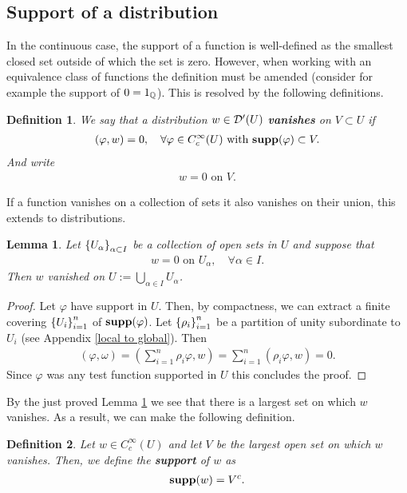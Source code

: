 \documentclass[12pt]{article}
\newtheorem{lemma}{Lemma}
\newtheorem{definition}{Definition}
\theoremstyle{remark}
\newcommand{\qt}[1]{\left(#1\right)}
\begin{document}
\subsection{Support of a distribution}
In the continuous case, the support of a function is well-defined as the smallest closed set outside of which the set is zero. However, when working with an equivalence class of functions the definition must be amended (consider for example the support of $0=1_{\mathbb{Q}}$). This is resolved by the following definitions.
\begin{definition} We say that a distribution $w \in \mathcal{D}'(U)$ \textbf{vanishes} on $V \subset U$ if
	\begin{align*}
		(\varphi, w)=0 , \quad\forall \varphi \in C_c^\infty(U) \text{ with } \mathbf{supp}(\varphi) \subset V  .
	\end{align*}
	And write
	\begin{align*}
		w =0 \text{ on } V.
	\end{align*}

\end{definition}
If a function vanishes on a collection of sets it also vanishes on their union, this extends to distributions.
\begin{lemma}\label{biggest vanish}
	Let  $\left\{U_\alpha\right\}_{\alpha \subset I} $ be a collection of open sets in $U$ and suppose that
	\begin{align*}
		w=0 \text{ on  } U_\alpha , \quad\forall \alpha \in I.
	\end{align*}
	Then $w$ vanished on  $U:=\bigcup_{\alpha \in  I}U_\alpha$.
\end{lemma}
\begin{proof}
	Let $\varphi$ have support in $U$. Then,     by compactness, we can extract a finite covering $\left\{U_i\right\}_{i=1}^n $ of $\mathbf{supp}(\varphi) $. Let $\left\{\rho _i\right\}_{i=1}^n $ be a partition of unity  subordinate to $U_i$ (see Appendix \ref{local to global}). Then
	\begin{align*}
		(\varphi,\omega)=\qt{\sum_{i=1}^n \rho _i \varphi,w }=\sum_{i=1}^n (\rho _i \varphi,w )=0 .
	\end{align*}
	Since $\varphi$ was any test function supported in $U$ this concludes the proof.
\end{proof}
By the just proved Lemma \ref{biggest vanish} we see that there is a largest set on which $w$ vanishes. As a result, we can make the following definition.
\begin{definition}\label{support def}
	Let $w \in C_c^\infty(U)$ and let  $V$ be the largest open set on which  $w$ vanishes. Then, we define the \textbf{support} of $w$ as
	\begin{align*}
		\mathbf{supp}(w)= V^c .
	\end{align*}
\end{definition}
\end{document}
